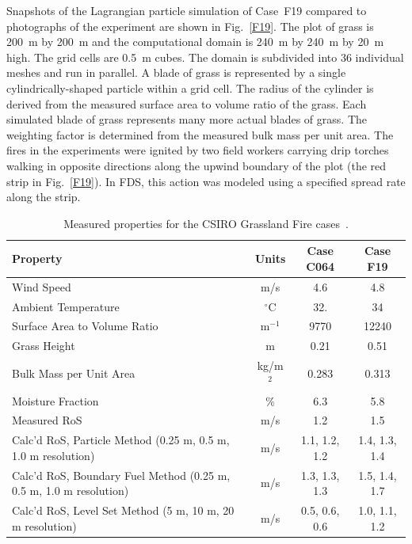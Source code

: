 \documentclass[journal,article,atmosphere,submit,moreauthors,pdftex]{Definitions/mdpi}
\begin{document}
Snapshots of the Lagrangian particle simulation of Case~F19 compared to photographs of the experiment are shown in Fig.~\ref{F19}. The plot of grass is 200~m by 200~m and the computational domain is 240~m by 240~m by 20~m high. The grid cells are 0.5~m cubes. The domain is subdivided into 36 individual meshes and run in parallel. A blade of grass is represented by a single cylindrically-shaped particle within a grid cell. The radius of the cylinder is derived from the measured surface area to volume ratio of the grass. Each simulated blade of grass represents many more actual blades of grass. The weighting factor is determined from the measured bulk mass per unit area. The fires in the experiments were ignited by two field workers carrying drip torches walking in opposite directions along the upwind boundary of the plot (the red strip in Fig.~\ref{F19}). In FDS, this action was modeled using a specified spread rate along the strip.

\begin{table}[ht]
\begin{center}
\caption[Measured properties for the CSIRO Grassland Fire cases]{Measured properties for the CSIRO Grassland Fire cases~\cite{Cheney:IJWF1993}.}
\label{Properties_Grasses}
\begin{tabular}{|l|c|c|c|}
\hline
Property                        & Units        & Case C064 & Case F19    \\ \hline \hline
Wind Speed                      & m/s          & 4.6       & 4.8         \\ \hline
Ambient Temperature             & $^\circ$C    & 32.       & 34          \\ \hline
Surface Area to Volume Ratio    & m$^{-1}$     & 9770      & 12240       \\ \hline
Grass Height                    & m            & 0.21      & 0.51        \\ \hline
Bulk Mass per Unit Area         & kg/m$^2$     & 0.283     & 0.313       \\ \hline
Moisture Fraction               & \%           & 6.3       & 5.8         \\ \hline
Measured RoS                    & m/s          & 1.2       & 1.5         \\ \hline
Calc'd RoS, Particle Method (0.25 m, 0.5 m, 1.0 m resolution) 
                                & m/s          & 1.1, 1.2, 1.2   & 1.4, 1.3, 1.4          \\ \hline
Calc'd RoS, Boundary Fuel Method (0.25 m, 0.5 m, 1.0 m resolution) 
                                & m/s          & 1.3, 1.3, 1.3   & 1.5, 1.4, 1.7          \\ \hline
Calc'd RoS, Level Set Method (5 m, 10 m, 20 m resolution) 
                                & m/s          & 0.5, 0.6, 0.6   & 1.0, 1.1, 1.2          \\ \hline
\end{tabular}
\end{center}
\end{table}
\end{document}
